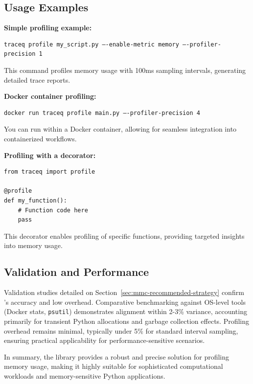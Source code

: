 \subsection{Usage Examples}
\label{sec:mmc-traceq-examples}

\textbf{Simple profiling example:}
\begin{verbatim}
traceq profile my_script.py –-enable-metric memory –-profiler-precision 1
\end{verbatim}

This command profiles memory usage with 100ms sampling intervals, generating detailed trace reports.

\textbf{Docker container profiling:}
\begin{verbatim}
docker run traceq profile main.py –-profiler-precision 4
\end{verbatim}

You can run within a Docker container, allowing for seamless integration into containerized workflows.

\textbf{Profiling with a decorator:}
\begin{verbatim}
from traceq import profile

@profile
def my_function():
    # Function code here
    pass
\end{verbatim}

This decorator enables profiling of specific functions, providing targeted insights into memory usage.

\subsection{Validation and Performance}
\label{sec:mmc-traceq-validation}

Validation studies detailed on Section~\ref{sec:mmc-recommended-strategy} confirm \traceq’s accuracy and low overhead.
Comparative benchmarking against \ac{OS}-level tools (Docker stats, \texttt{psutil}) demonstrates alignment within 2-3\% variance, accounting primarily for transient Python allocations and garbage collection effects.
Profiling overhead remains minimal, typically under 5\% for standard interval sampling, ensuring practical applicability for performance-sensitive scenarios.

In summary, the \traceq library provides a robust and precise solution for profiling memory usage, making it highly suitable for sophisticated computational workloads and memory-sensitive Python applications.
